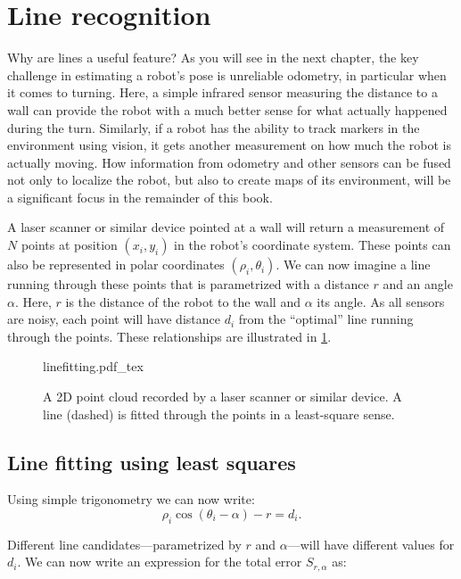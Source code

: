 \section{Line recognition}
\label{sec:line_recognition}
Why are lines a useful feature? As you will see in the next chapter, the key challenge in estimating a robot's pose is unreliable odometry, in particular when it comes to turning. Here, a simple infrared sensor measuring the distance to a wall can provide the robot with a much better sense for what actually happened during the turn. Similarly, if a robot has the ability to track markers in the environment using vision, it gets another measurement on how much the robot is actually moving. How information from odometry and other sensors can be fused not only to localize the robot, but also to create maps of its environment, will be a significant focus in the remainder of this book.

A laser scanner or similar device pointed at a wall will return a measurement of $N$ points at position $(x_i,y_i)$ in the robot's coordinate system. These points can also be represented in polar coordinates $ (\rho_i,\theta_i)$. We can now imagine a line running through these points that is parametrized with a distance $r$ and an angle $\alpha$. Here, $r$ is the distance of the robot to the wall and $ \alpha$ its angle. As all sensors are noisy, each point will have distance $d_i$ from the ``optimal'' line running through the points. These relationships are illustrated in \cref{fig:linefitting}.

\begin{figure}
	\centering
    \def\svgwidth{\textwidth}
    {linefitting.pdf_tex}
	\caption{A 2D point cloud recorded by a laser scanner or similar device. A line (dashed) is fitted through the points in a least-square sense.}
	\label{fig:linefitting}
\end{figure}

\subsection{Line fitting using least squares}
Using simple trigonometry we can now write:
\begin{equation}
\rho_i \cos(\theta_i-\alpha)-r=d_i.
\end{equation}

Different line candidates---parametrized by $ r$ and $ \alpha$---will have different values for $ d_i$. We can now write an expression for the total error $ S_{r,\alpha}$ as:

